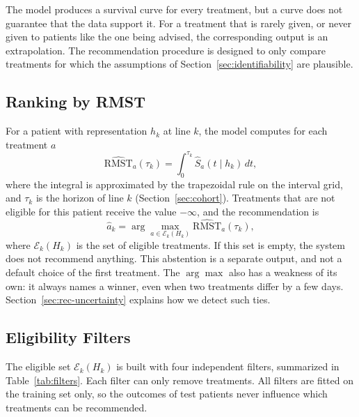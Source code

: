 \documentclass[a4paper,10pt]{article}
\begin{document}
The model produces a survival curve for every treatment, but a curve does not guarantee that the data support it. For a treatment that is rarely given, or never given to patients like the one being advised, the corresponding output is an extrapolation. The recommendation procedure is designed to only compare treatments for which the assumptions of Section~\ref{sec:identifiability} are plausible.

\subsection{Ranking by RMST}

For a patient with representation $h_k$ at line $k$, the model computes for each treatment $a$
\begin{equation}
    \widehat{\text{RMST}}_a(\tau_k) = \int_0^{\tau_k} \hat{S}_a(t \mid h_k)\, dt,
\end{equation}
where the integral is approximated by the trapezoidal rule on the interval grid, and $\tau_k$ is the horizon of line $k$ (Section~\ref{sec:cohort}). Treatments that are not eligible for this patient receive the value $-\infty$, and the recommendation is
\begin{equation}
    \hat{a}_k = \arg\max_{a \in \mathcal{E}_k(H_k)} \widehat{\text{RMST}}_a(\tau_k),
\end{equation}
where $\mathcal{E}_k(H_k)$ is the set of eligible treatments. If this set is empty, the system does not recommend anything. This abstention is a separate output, and not a default choice of the first treatment. The $\arg\max$ also has a weakness of its own: it always names a winner, even when two treatments differ by a few days. Section~\ref{sec:rec-uncertainty} explains how we detect such ties.

\subsection{Eligibility Filters}

The eligible set $\mathcal{E}_k(H_k)$ is built with four independent filters, summarized in Table~\ref{tab:filters}. Each filter can only remove treatments. All filters are fitted on the training set only, so the outcomes of test patients never influence which treatments can be recommended.
\end{document}
